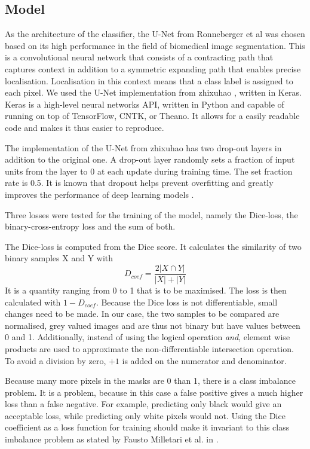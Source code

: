 \subsection{Model}
As the architecture of the classifier, the U-Net from Ronneberger et al \cite{ronneberger_u-net:_2015} was chosen based on its high performance in the field of biomedical image segmentation.
This is a convolutional neural network that consists of a contracting path that captures context in addition to a symmetric expanding path that enables precise localisation.
Localisation in this context means that a class label is assigned to each pixel.
We used the U-Net implementation from zhixuhao \cite{zhixuhao_zhixuhao/unet_2020}, written in Keras.
Keras is a high-level neural networks API, written in Python and capable of running on top of TensorFlow, CNTK, or Theano.
It allows for a easily readable code and makes it thus easier to reproduce.

The implementation of the U-Net from zhixuhao has two drop-out layers in addition to the original one.
A drop-out layer randomly sets a fraction of input units from the layer to 0 at each update during training time.
The set fraction rate is 0.5.
It is known that dropout helps prevent overfitting and greatly improves the performance of deep learning models \cite{srivastava_dropout:_nodate}.

Three losses were tested for the training of the model, namely the Dice-loss, the binary-cross-entropy loss and the sum of both.

The Dice-loss is computed from the Dice score. It calculates the similarity of two binary samples X and Y with
$$D_{coef} = \frac{2|X\cap Y|}{|X|+|Y|}$$
It is a quantity ranging from 0 to 1 that is to be maximised.
The loss is then calculated with $1-D_{coef}$.
Because the Dice loss is not differentiable, small changes need to be made.
In our case, the two samples to be compared are normalised, grey valued images  and are thus not binary but have values between 0 and 1. 
Additionally, instead of using the logical operation \textit{and}, element wise products are used to approximate the non-differentiable intersection operation.
To avoid a division by zero, $+1$ is added on the numerator and denominator.

Because many more pixels in the masks are 0 than 1, there is a class imbalance problem.
It is a problem, because in this case a false positive gives a much higher loss than a false negative.
For example, predicting only black would give an acceptable loss, while predicting only white pixels would not.
Using the Dice coefficient as a loss function for training should make it invariant to this class imbalance problem as stated by Fausto Milletari et al. in \cite{milletari_v-net:_2016}.

